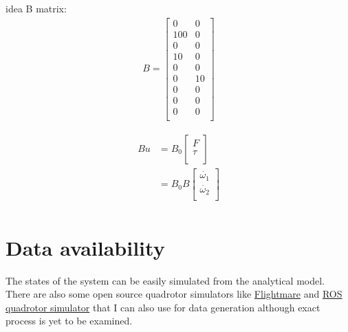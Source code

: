 \documentclass[12pt]{article}
\begin{document}
idea B matrix:
\begin{align*}
    B = \begin{bmatrix}
        0 & 0 \\
        100 & 0 \\
        0 & 0 \\
        10 & 0 \\
        0 & 0 \\
        0 & 10 \\
        0 & 0 \\
        0 & 0 \\
        0 & 0 \\
    \end{bmatrix}
\end{align*}

\begin{align*}
    B u &= B_0
    \begin{bmatrix}
        F \\
        \tau \\
    \end{bmatrix} \\
    &=B_0 B 
    \begin{bmatrix}
        \dot{\omega_1} \\
        \dot{\omega_2} \\
    \end{bmatrix} \\
\end{align*}





\section*{Data availability}
The states of the system can be easily simulated from the analytical model. There are also some open source quadrotor simulators like \href{https://github.com/uzh-rpg/flightmare}{Flightmare} and \href{https://github.com/wilselby/ROS_quadrotor_simulator}{ROS quadrotor simulator} that I can also use for data generation although exact process is yet to be examined. \\\\
\end{document}
